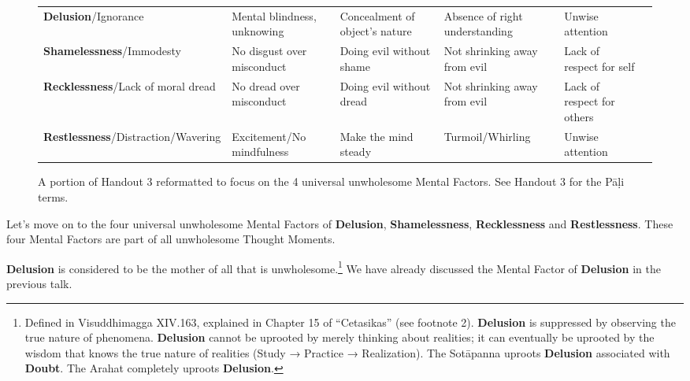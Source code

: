 \begin{figure} [H]

\setlength{\tabcolsep}{0pt}
\renewcommand{\arraystretch}{1.1}

\begin{tabular}{P{0.25\textwidth} | C{.185\textwidth} C{0.185\textwidth} C{0.185\textwidth} C{0.195\textwidth} m{0mm}}
\toprule
 &  &  &  & \\
\midrule
\textbf{Delusion}/\newline Ignorance & Mental blindness, unknowing & Concealment of object’s nature & Absence of right understanding & Unwise attention  &\\[9mm]
\textbf{Shamelessness}/\newline Immodesty & No disgust over misconduct & Doing evil without shame & Not shrinking away from evil & Lack of respect for self &\\[9mm]
\textbf{Recklessness}/\newline Lack of moral dread & No dread over misconduct & Doing evil without dread & Not shrinking away from evil & Lack of respect for others &\\[9mm]
\textbf{Restlessness}/\newline Distraction/Wavering & Excitement/\newline No mindfulness & Make the mind steady & Turmoil/\newline Whirling & Unwise attention &\\[9mm]
\bottomrule
\end{tabular}

\caption{A portion of Handout 3 reformatted to focus on the 4 universal unwholesome Mental Factors. See Handout 3 for the Pāḷi terms.}

\end{figure}

Let’s move on to the four universal unwholesome Mental Factors of \textbf{Delusion}, \textbf{Shamelessness}, \textbf{Recklessness} and \textbf{Restlessness}. These four Mental Factors are part of all unwholesome Thought Moments.

\textbf{Delusion} is considered to be the mother of all that is unwholesome.\footnote{Defined in Visuddhimagga XIV.163, explained in Chapter 15 of “Cetasikas” (see footnote 2). \textbf{Delusion} is suppressed by observing the true nature of phenomena. \textbf{Delusion} cannot be uprooted by merely thinking about realities; it can eventually be uprooted by the wisdom that knows the true nature of realities (Study → Practice → Realization). The Sotāpanna uproots \textbf{Delusion} associated with \textbf{Doubt}. The Arahat completely uproots \textbf{Delusion}.} We have already discussed the Mental Factor of \textbf{Delusion} in the previous talk.

